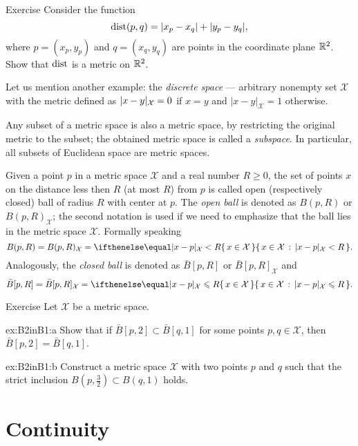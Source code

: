 \begin{thm}{Exercise}\label{ex:ell-infty}
Consider the function
$$\mathop{\rm dist}\nolimits(p,q)=|x_p-x_q|+|y_p-y_q|,$$
where $p=(x_p,y_p)$ and $q=(x_q,y_q)$ are points in the coordinate plane $\mathbb{R}^2$.
Show that $\mathop{\rm dist}\nolimits$ is a metric on $\mathbb{R}^2$.
\end{thm}

Let us mention another example: the \emph{discrete space} --- arbitrary nonempty set $\mathcal X$ with the metric defined as $|x\z-y|_{\mathcal X}=0$ if $x=y$ and $|x-y|_{\mathcal X}=1$ otherwise.

Any subset of a metric space is also a metric space, by restricting the original metric to the subset;
the obtained metric space is called a \emph{subspace}.
In particular, all subsets of Euclidean space are metric spaces.

Given a point $p$ in a metric space ${\mathcal X}$ and a real number $R\ge 0$, the set of points $x$ on the distance less then $R$ (at most $R$) from $p$ is called open (respectively closed) ball of radius $R$ with center at $p$.
The \emph{open ball} is denoted as $B(p,R)$ or $B(p,R)_{\mathcal X}$;
the second notation is used if we need to emphasize that the ball lies in the metric space $\mathcal X$.
Formally speaking
\[B(p,R)=B(p,R)_{\mathcal X}=\set{x\in \mathcal X}{|x-p|_{\mathcal X}< R}.\]
Analogously, the \emph{closed ball} is denoted as $\bar B[p,R]$ or $\bar B[p,R]_{\mathcal X}$ and
\[\bar B[p,R]=\bar B[p,R]_{\mathcal X}=\set{x\in \mathcal X}{|x-p|_{\mathcal X}\le R}.\]

\begin{thm}{Exercise}\label{ex:B2inB1}
Let $\mathcal X$ be a metric space.

\begin{subthm}{ex:B2inB1:a} Show that if $\bar B[p,2]\subset \bar B[q,1]$ for some points $p,q\in \mathcal X$, then $\bar B[p,2]= \bar B[q,1]$.
\end{subthm}

\begin{subthm}{ex:B2inB1:b} Construct a metric space $\mathcal X$ with two points $p$ and $q$ such that the strict inclusion
$B(p,\tfrac32)\subset B(q,1)$ holds.
\end{subthm}

\end{thm}



\section*{Continuity}


